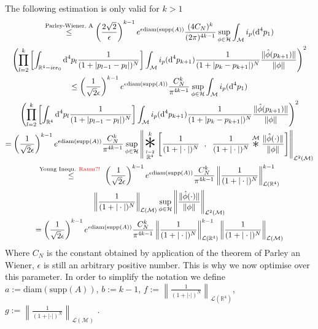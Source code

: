 \documentclass[a4paper,12pt]{article}
\newcommand{\letext}[1]{\ensuremath{\stackrel{\text{#1}}{\le}}}
\newcommand{\Conv}{\mathop{\scalebox{1.7}{\raisebox{-0.2ex}{\(\ast\)}}}}
\newcommand{\CONV}{\mathop{\scalebox{3.0}{\raisebox{-0.2ex}{\(\ast\)}}}}
\begin{document}
 The following estimation is only valid for \(k>1\)
 \begin{multline}
 \letext{Parley-Wiener, A} \left(\frac{2\sqrt{2}}{\epsilon}\right)^{k-1} e^{\epsilon \text{diam}(\text{supp}(A)) } \frac{(4 C_N)^k}{(2\pi)^{4k-1}}  \sup_{\phi\in\mathcal{H}}\int_{\mathcal{M}} i_p(\text{d}^4p_1) \\ 
 \left(\prod_{l=2}^{k} \left[ \int_{\mathbb{R}^4-i \epsilon e_0} \text{d}^4p_l \frac{1}{(1+|p_{l-1}-p_l |)^N}
 \right] \int_{\mathcal{M}}  i_p(\text{d}^4p_{k+1})\frac{1}{(1+|p_{k}-p_{k+1} |)^N}\frac{\|\hat{\phi}(p_{k+1})\|}{\|\phi\|}\right)^2\\
  \le \left(\frac{1}{\sqrt{2} \epsilon}\right)^{k-1} e^{\epsilon \text{diam}(\text{supp}(A)) } \frac{ C_N^k}{\pi^{4k-1}}  \sup_{\phi\in\mathcal{H}}\int_{\mathcal{M}} i_p(\text{d}^4p_1) \\ 
 \left(\prod_{l=2}^{k} \left[ \int_{\mathbb{R}^4} \text{d}^4p_l \frac{1}{(1+|p_{l-1}-p_l |)^N}
 \right] \int_{\mathcal{M}}  i_p(\text{d}^4p_{k+1})\frac{1}{(1+|p_{k}-p_{k+1} |)^N}\frac{\|\hat{\phi}(p_{k+1})\|}{\|\phi\|}\right)^2\\
= \left(\frac{1}{\sqrt{2} \epsilon}\right)^{k-1} e^{\epsilon \text{diam}(\text{supp}(A)) } \frac{ C_N^k}{\pi^{4k-1}}  \sup_{\phi\in\mathcal{H}} \left\| 
\CONV_{\stackrel{l=2}{\mathbb{R}^4}}^{k} \left[  \frac{1}{(1+|\cdot |)^N}
  \hspace{0.2cm} ,\hspace{0.2cm}  \frac{1}{(1+|\cdot |)^N}\stackrel{\mathcal{M}}{\Conv}\frac{\|\hat{\phi}(\cdot)\|}{\|\phi\|}\right] \right\|_{\mathcal{L}^2(\mathcal{M})}\\
  \letext{Young Inequ. \textcolor{red}{Raum?!} } \left(\frac{1}{\sqrt{2} \epsilon}\right)^{k-1} e^{\epsilon \text{diam}(\text{supp}(A)) } \frac{ C_N^k}{\pi^{4k-1}}  \left\|\frac{1}{(1+|\cdot |)^N} \right\|_{\mathcal{L}(\mathbb{R}^4)}^{k-1}\\
    \left\|\frac{1}{(1+|\cdot |)^N} \right\|_{\mathcal{L}(\mathcal{M})}   \sup_{\phi\in\mathcal{H}} \left\| 
\frac{\|\hat{\phi}(\cdot)\|}{\|\phi\|}\right\|_{\mathcal{L}^2(\mathcal{M})}\\
= \left(\frac{1}{\sqrt{2} \epsilon}\right)^{k-1} e^{\epsilon \text{diam}(\text{supp}(A)) } \frac{ C_N^k}{\pi^{4k-1}}  \left\|\frac{1}{(1+|\cdot |)^N} \right\|_{\mathcal{L}(\mathbb{R}^4)}^{k-1}  \left\|\frac{1}{(1+|\cdot |)^N} \right\|_{\mathcal{L}(\mathcal{M})} 
\end{multline}
Where \(C_N\) is the constant obtained by application of the theorem of Parley an Wiener, \(\epsilon\) is still an arbitrary positive number. This is why we now optimise over this parameter. In order to simplify the notation we define \(a:=\text{diam}(\text{supp}(A))\), \(b:= k-1\), \(f:=\left\|\frac{1}{(1+|\cdot |)^N} \right\|_{\mathcal{L}(\mathbb{R}^4)}\), \(g:=\left\|\frac{1}{(1+|\cdot |)^N} \right\|_{\mathcal{L}(\mathcal{M})} \) .
\end{document}

